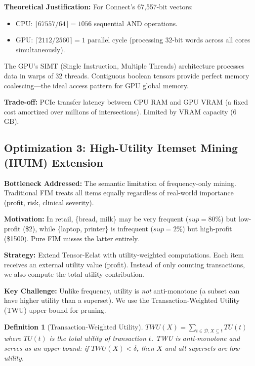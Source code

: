 \documentclass[conference]{IEEEtran}
\newtheorem{definition}{Definition}
\begin{document}
\textbf{Theoretical Justification:} For Connect's 67,557-bit vectors:
\begin{itemize}
    \item CPU: $\lceil 67557/64 \rceil = 1056$ sequential AND operations.
    \item GPU: $\lceil 2112/2560 \rceil = 1$ parallel cycle (processing 32-bit words across all cores simultaneously).
\end{itemize}

The GPU's SIMT (Single Instruction, Multiple Threads) architecture processes data in warps of 32 threads. Contiguous boolean tensors provide perfect memory coalescing---the ideal access pattern for GPU global memory.

\textbf{Trade-off:} PCIe transfer latency between CPU RAM and GPU VRAM (a fixed cost amortized over millions of intersections). Limited by VRAM capacity (6 GB).

\subsection{Optimization 3: High-Utility Itemset Mining (HUIM) Extension}

\textbf{Bottleneck Addressed:} The semantic limitation of frequency-only mining. Traditional FIM treats all items equally regardless of real-world importance (profit, risk, clinical severity).

\textbf{Motivation:} In retail, \{bread, milk\} may be very frequent ($sup = 80\%$) but low-profit (\$2), while \{laptop, printer\} is infrequent ($sup = 2\%$) but high-profit (\$1500). Pure FIM misses the latter entirely.

\textbf{Strategy:} Extend Tensor-Eclat with utility-weighted computations. Each item receives an external utility value (profit). Instead of only counting transactions, we also compute the total utility contribution.

\textbf{Key Challenge:} Unlike frequency, utility is \textit{not} anti-monotone (a subset can have higher utility than a superset). We use the Transaction-Weighted Utility (TWU) upper bound for pruning.

\begin{definition}[Transaction-Weighted Utility]
$TWU(X) = \sum_{t \in \mathcal{D}, X \subseteq t} TU(t)$ where $TU(t)$ is the total utility of transaction $t$. TWU is anti-monotone and serves as an upper bound: if $TWU(X) < \delta$, then $X$ and all supersets are low-utility.
\end{definition}
\end{document}
